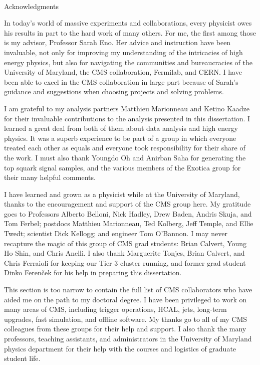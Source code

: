 
\renewcommand{\baselinestretch}{2}
\small\normalsize
\hbox{\ }
 
\vspace{-.65in}

\begin{center}
\large{Acknowledgments} 
\end{center} 

\vspace{1ex}

In today's world of massive experiments and collaborations, every physicist owes his results in part to the hard work of many others. For me, the first among those is my advisor, Professor Sarah Eno. Her advice and instruction have been invaluable, not only for improving my understanding of the intricacies of high energy physics, but also for navigating the communities and bureaucracies of the University of Maryland, the CMS collaboration, Fermilab, and CERN. I have been able to excel in the CMS collaboration in large part because of Sarah's guidance and suggestions when choosing projects and solving problems.

I am grateful to my analysis partners Matthieu Marionneau and Ketino Kaadze for their invaluable contributions to the analysis presented in this dissertation. I learned a great deal from both of them about data analysis and high energy physics. It was a superb experience to be part of a group in which everyone treated each other as equals and everyone took responsibility for their share of the work. I must also thank Youngdo Oh and Anirban Saha for generating the top squark signal samples, and the various members of the Exotica group for their many helpful comments.

I have learned and grown as a physicist while at the University of Maryland, thanks to the encouragement and support of the CMS group here. My gratitude goes to Professors Alberto Belloni, Nick Hadley, Drew Baden, Andris Skuja, and Tom Ferbel; postdocs Matthieu Marionneau, Ted Kolberg, Jeff Temple, and Ellie Twedt; scientist Dick Kellogg; and engineer Tom O'Bannon. I may never recapture the magic of this group of CMS grad students: Brian Calvert, Young Ho Shin, and Chris Anelli. I also thank Marguerite Tonjes, Brian Calvert, and Chris Ferraioli for keeping our Tier 3 cluster running, and former grad student Dinko Feren\v{c}ek for his help in preparing this dissertation.

This section is too narrow to contain the full list of CMS collaborators who have aided me on the path to my doctoral degree. I have been privileged to work on many areas of CMS, including trigger operations, HCAL, jets, long-term upgrades, fast simulation, and offline software. My thanks go to all of my CMS colleagues from these groups for their help and support. I also thank the many professors, teaching assistants, and administrators in the University of Maryland physics department for their help with the courses and logistics of graduate student life.

